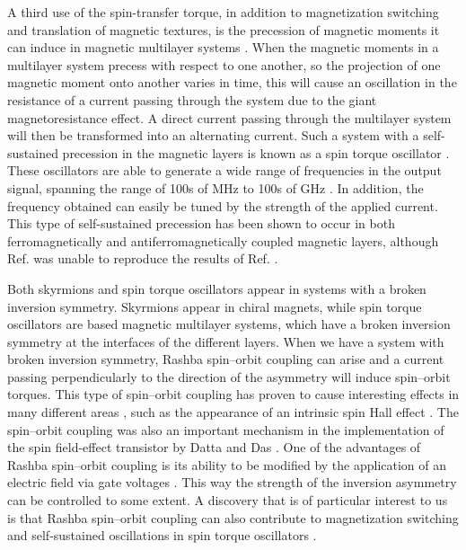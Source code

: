 A third use of the spin-transfer torque, in addition to magnetization switching and translation of magnetic textures, is the precession of magnetic moments it can induce in magnetic multilayer systems \cite{Tsoi2000,Kiselev2003,Rippard2004}. When the magnetic moments in a multilayer system precess with respect to one another, so the projection of one magnetic moment onto another varies in time, this will cause an oscillation in the resistance of a current passing through the system due to the giant magnetoresistance effect. A direct current passing through the multilayer system will then be transformed into an alternating current. Such a system with a self-sustained precession in the magnetic layers is known as a spin torque oscillator \cite{Silva2008,Kim2012STO}. These oscillators are able to generate a wide range of frequencies in the output signal, spanning the range of 100s of MHz to 100s of GHz \cite{Katine2008,Silva2008,Sun2008}. In addition, the frequency obtained can easily be tuned by the strength of the applied current. This type of self-sustained precession has been shown to occur in both ferromagnetically \cite{Zhou2013} and antiferromagnetically \cite{Klein2012} coupled magnetic layers, although Ref. \cite{Zhou2013} was unable to reproduce the results of Ref. \cite{Klein2012}. 

Both skyrmions and spin torque oscillators appear in systems with a broken inversion symmetry. Skyrmions appear in chiral magnets, while spin torque oscillators are based magnetic multilayer systems, which have a broken inversion symmetry at the interfaces of the different layers. When we have a system with broken inversion symmetry, Rashba spin--orbit coupling \cite{BychovRashba1984,Heide2006} can arise and a current passing perpendicularly to the direction of the asymmetry will induce spin--orbit torques. This type of spin--orbit coupling has proven to cause interesting effects in many different areas \cite{Manchon2015}, such as the appearance of an intrinsic spin Hall effect \cite{Sinova2004}. The spin--orbit coupling was also an important mechanism in the implementation of the spin field-effect transistor by Datta and Das \cite{DattaDas1990}. One of the advantages of Rashba spin--orbit coupling is its ability to be modified by the application of an electric field via gate voltages \cite{Schultz1996,Nitta1997}. This way the strength of the inversion asymmetry can be controlled to some extent. A discovery that is of particular interest to us is that Rashba spin--orbit coupling can also contribute to magnetization switching and self-sustained oscillations in spin torque oscillators \cite{Miron2011,Duan2014}.

